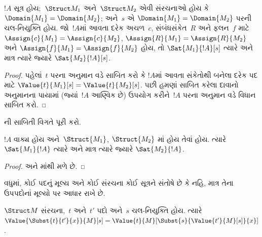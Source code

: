 \begin{prop}[પ્રસ્તુત ઘટકો દ્વારા નિર્ધારણ]
  $!A$ સૂત્ર હોય;~$\Struct M_1$ અને~$\Struct M_2$ એવી
  સંરચનાઓ હોય કે $\Domain{M_1}=\Domain{M_2}$; અને~$s$ એ
  $\Domain{M_1}=\Domain{M_2}$ પરની ચલ-નિયુક્તિ હોય. જો~$!A$માં આવતા
  દરેક અચળ~$c$, સંબંધસંકેત~$R$ અને ફલન~$f$ માટે
  $\Assign{c}{M_1}=\Assign{c}{M_2}$,
  $\Assign{R}{M_1}=\Assign{R}{M_2}$ અને
  $\Assign{f}{M_1}=\Assign{f}{M_2}$ હોય, તો
  $\Sat{M_1}{!A}[s]$ ત્યારે અને માત્ર ત્યારે જ્યારે
  $\Sat{M_2}{!A}[s]$.
\end{prop}

\begin{proof}
  પહેલાં~$t$ પરના અનુમાન વડે સાબિત કરો કે $!A$માં આવતા સંકેતોથી બનેલા દરેક પદ માટે
  $\Value{t}{M_1}[s]=\Value{t}{M_2}[s]$. પછી હમણાં સાબિત કરેલા દાવાનો
  અનુમાનના પાયામાં (જ્યાં~$!A$ આણ્વિક છે) ઉપયોગ કરીને~$!A$ પરના
  અનુમાન વડે વિધાન સાબિત કરો.
\end{proof}

\begin{prob}
ની સાબિતી વિગતે પૂરી કરો.
\end{prob}

\begin{cor}[વાક્યો માટે પ્રસ્તુત ઘટકો દ્વારા નિર્ધારણ]
  $!A$ વાક્ય હોય અને~$\Struct{M_1}$, $\Struct{M_2}$
  માં હોય તેવાં હોય. ત્યારે
  $\Sat{M_1}{!A}$ ત્યારે અને માત્ર ત્યારે જ્યારે $\Sat{M_2}{!A}$.
\end{cor}

\begin{proof}
 અને માંથી મળે છે.
\end{proof}

વધુમાં, કોઈ પદનું મૂલ્ય અને કોઈ સંરચના કોઈ સૂત્રને
સંતોષે છે કે નહિ, માત્ર તેના ઉપપદોનાં મૂલ્યો પર આધાર રાખે છે.

\begin{prop}
$\Struct M$ સંરચના,~$t$ અને~$t'$ પદો અને~$s$ ચલ-નિયુક્તિ હોય.
ત્યારે $\Value{\Subst{t}{t'}{x}}{M}[s] =
\Value{t}{M}[\Subst{s}{\Value{t'}{M}[s]}{x}]$.
\end{prop}

